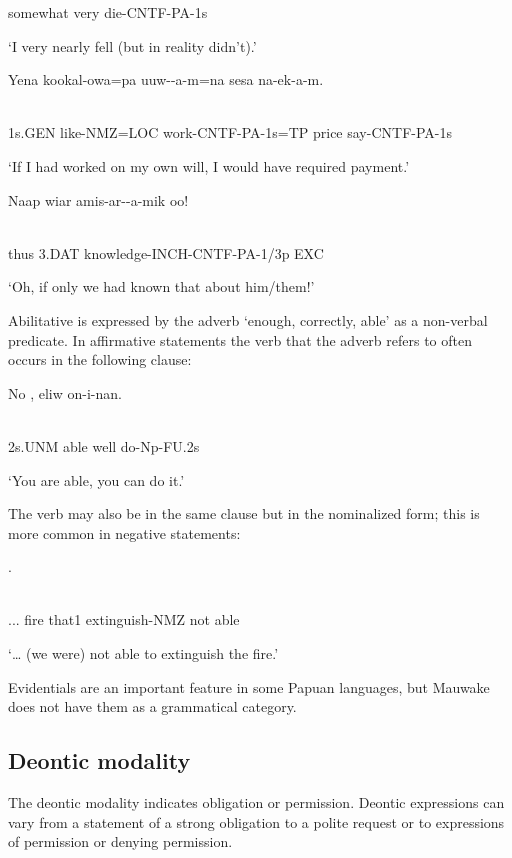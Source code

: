 somewhat  very  die-CNTF-PA-1s

`I very nearly fell (but in reality didn't).'

\ea%
\label{ex:x1055}
\gll Yena  kookal-owa=pa  uuw--a-m=na  sesa  na-ek-a-m. \\
      \\
\glt
\z

1s.GEN  like-NMZ=LOC  work-CNTF-PA-1s=TP  price  say-CNTF-PA-1s

`If I had worked on my own will, I would have required payment.'

\ea%
\label{ex:x1056}
\gll Naap  wiar  amis-ar--a-mik  oo! \\
      \\
\glt
\z

thus  3.DAT  knowledge-INCH-CNTF-PA-1/3p  EXC

`Oh, if only we had known that about him/them!'

Abilitative is expressed by the adverb  `enough, correctly, able' as a non-verbal predicate. In affirmative statements the verb that the adverb refers to often occurs in the following clause:

\ea%
\label{ex:x1089}
\gll No  ,  eliw  on-i-nan. \\
      \\
\glt
\z

2s.UNM  able  well  do-Np-FU.2s

`You are able, you can do it.'

The verb may also be in the same clause but in the nominalized form; this is more common in negative statements:

\ea%
\label{ex:x1088}
   . \\
      \\
\glt
\z

...  fire  that1  extinguish-NMZ  not  able

`{\dots} (we were) not able to extinguish the fire.'

Evidentials are an important feature in some Papuan languages, but Mauwake does not have them as a grammatical category.

\subsection{Deontic modality}
\hypertarget{RefHeading22361935131865}{}
The deontic modality indicates obligation or permission. Deontic expressions can vary from a statement of a strong obligation to a polite request or to expressions of permission or denying permission. 

